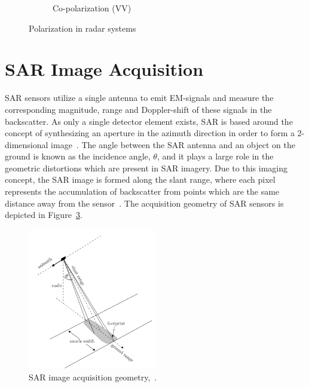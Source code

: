 \begin{figure}[H]
\begin{subfigure}[b]{0.45\textwidth}
    \caption{Co-polarization (VV) }
    \label{fig:2a}
  \end{subfigure}
  \caption{Polarization in radar systems}
  \label{fig:pol}
\end{figure}




\section{SAR Image Acquisition}
SAR sensors utilize a single antenna to emit EM-signals and measure the corresponding magnitude, range and Doppler-shift of these signals in the
backscatter. 
As only a single detector element exists, SAR is based around the concept of synthesizing an aperture in the azimuth direction in order to form a 2-dimensional
image~\citep{Orth2018}. The angle between the SAR antenna and an object on the ground is known as the incidence angle, $\theta$, and it plays a large role in the geometric distortions which are
present in SAR imagery. Due to this imaging concept, the SAR image is formed along the slant range, where each pixel represents the accumulation of backscatter from points which are the same distance away from the sensor~\citep{cumming2005digital}. The acquisition geometry of  SAR sensors is depicted in Figure~\ref{fig:Sentinel-1}.

\begin{figure}[H]
    \centering
    \includegraphics[width=0.5\textwidth]{../../Images/PNG/image_adquisition.png}
    \caption[Sentinel-1 radar.]{SAR image acquisition geometry,~\citep{hughes2020deep}.}
    \label{fig:Sentinel-1}
\end{figure}

